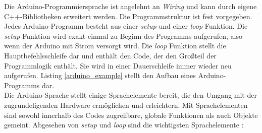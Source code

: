 Die Arduino-Programmiersprache ist angelehnt an \textit{Wiring} \cite{wiring} und kann durch eigene C++-Bibliotheken erweitert werden. Die Programmstruktur ist fest vorgegeben. Jedes Arduino-Programm besteht aus einer \textit{setup} und einer \textit{loop} Funktion. Die \textit{setup} Funktion wird exakt einmal zu Beginn des Programms aufgerufen, also wenn der Arduino mit Strom versorgt wird. Die \textit{loop} Funktion stellt die Hauptbefehlsschleife dar und enthält den Code, der den Großteil der Programmlogik enthält. Sie wird in einer Dauerschleife immer wieder neu aufgerufen. Listing \ref{arduino_example} stellt den Aufbau eines Arduino-Programms dar.\\

Die Arduino-Sprache stellt einige Sprachelemente bereit, die den Umgang mit der zugrundeligenden Hardware ermöglichen und erleichtern. Mit Sprachelementen sind sowohl innerhalb des Codes zugreifbare, globale Funktionen als auch Objekte gemeint. Abgesehen von \textit{setup} und \textit{loop} sind die wichtigsten Sprachelemente \cite{arduino_language}: 
